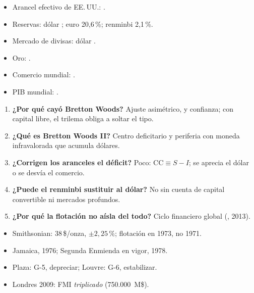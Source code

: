 \documentclass{article}
\begin{document}
\begin{columnas}
\anexorepaso
{}
\begin{itemize}
\item Arancel efectivo de EE.\,UU.: .
\item Reservas: dólar ; euro 20,6\,\%; renminbi 2,1\,\%.
\item Mercado de divisas: dólar .
\item Oro: .
\item Comercio mundial: .
\item PIB mundial: .
\end{itemize}
\begin{enumerate}
\item \textbf{¿Por qué cayó Bretton Woods?} Ajuste asimétrico,  y confianza; con capital libre, el trilema obliga a soltar el tipo.
\item \textbf{¿Qué es Bretton Woods II?} Centro deficitario y periferia con moneda infravalorada que acumula dólares.
\item \textbf{¿Corrigen los aranceles el déficit?} Poco: $\mathrm{CC}\equiv S-I$; se aprecia el dólar o se desvía el comercio.
\item \textbf{¿Puede el renminbi sustituir al dólar?} No sin cuenta de capital convertible ni mercados profundos.
\item \textbf{¿Por qué la flotación no aísla del todo?} Ciclo financiero global (, 2013).
\end{enumerate}
\begin{trampa}
\begin{itemize}
\item Smithsonian: 38\,\$/onza, $\pm2{,}25$\,\%; flotación en 1973, no 1971.
\item Jamaica, 1976; Segunda Enmienda en vigor, 1978.
\item Plaza: G-5, depreciar; Louvre: G-6, estabilizar.
\item Londres 2009: FMI \emph{triplicado} (750.000~M\$).
\end{itemize}
\end{trampa}

\end{columnas}
\end{document}
